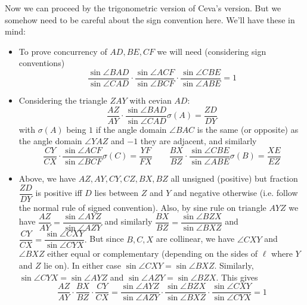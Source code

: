 \documentclass[11pt,a4paper]{article}
\begin{document}
\begin{enumerate}
	Now we can proceed by the trigonometric version of Ceva's version. But we somehow need to be careful about the sign convention here. We'll have these in mind: 
	\begin{itemize}
		\item To prove concurrency of $AD, BE, CF$ we will need (considering sign conventions)
		\[
		\dfrac{\sin\angle BAD}{\sin\angle CAD}\cdot\dfrac{\sin\angle ACF}{\sin\angle BCF}\cdot\dfrac{\sin\angle CBE}{\sin\angle ABE} = 1
		\]
		
		\item Considering the triangle $ZAY$ with cevian $AD$: 
		\[
		\dfrac{AZ}{AY}\cdot \dfrac{\sin\angle BAD}{\sin\angle CAD}\sigma(A) = \dfrac{ZD}{DY}
		\]
		with $\sigma (A)$ being $1$ if the angle domain $\angle BAC$ is the same (or opposite) as the angle domain $\angle YAZ$ and $-1$ they are adjacent, 
		and similarly 
		\[
		\dfrac{CY}{CX}\cdot \dfrac{\sin\angle ACF}{\sin\angle BCF}\sigma(C) = \dfrac{YF}{FX}\qquad
		\dfrac{BX}{BZ}\cdot \dfrac{\sin\angle CBE}{\sin\angle ABE}\sigma(B) = \dfrac{XE}{EZ}
		\]
		
		\item Above, we have $AZ, AY, CY, CZ, BX, BZ$ all unsigned (positive) but fraction $\dfrac{ZD}{DY}$ is positive iff $D$ lies between $Z$ and $Y$ and negative otherwise (i.e. follow the normal rule of signed convention). Also, by sine rule on triangle $AYZ$ we have $\dfrac{AZ}{AY} = \dfrac{\sin\angle AYZ}{\sin\angle AZY}$ and similarly $\dfrac{BX}{BZ}=\dfrac{\sin\angle BZX}{\sin\angle BXZ}$ and $\dfrac{CY}{CX}=\dfrac{\sin\angle CXY}{\sin\angle CYX}.$ 
		But since $B, C, X$ are collinear, we have $\angle CXY$ and $\angle BXZ$ either equal or complementary (depending on the sides of $\ell$ where $Y$ and $Z$ lie on). In either case $\sin\angle CXY = \sin\angle BXZ$. Similarly, $\sin\angle CYX = \sin\angle AYZ$ and $\sin\angle AZY=\sin\angle BZX$. This gives 
		\[
		\dfrac{AZ}{AY}\cdot\dfrac{BX}{BZ}\cdot\dfrac{CY}{CX}=\dfrac{\sin\angle AYZ}{\sin\angle AZY}\cdot\dfrac{\sin\angle BZX}{\sin\angle BXZ}\cdot\dfrac{\sin\angle CXY}{\sin\angle CYX}=1
		\]
		

\end{itemize}
\end{enumerate}
\end{document}

